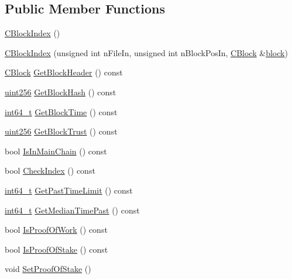 \subsection*{Public Member Functions}
\begin{DoxyCompactItemize}
\item 
\hyperlink{class_c_block_index_a0eff34cbfb4470885020734581dc1555}{C\+Block\+Index} ()
\item 
\hyperlink{class_c_block_index_a59e8716601432cd20856d45bc2f10633}{C\+Block\+Index} (unsigned int n\+File\+In, unsigned int n\+Block\+Pos\+In, \hyperlink{class_c_block}{C\+Block} \&\hyperlink{core_8h_ace80c27428e237fe24f54ae915a36133}{block})
\item 
\hyperlink{class_c_block}{C\+Block} \hyperlink{class_c_block_index_a34041486523d190d9ede5d83461fdc00}{Get\+Block\+Header} () const 
\item 
\hyperlink{classuint256}{uint256} \hyperlink{class_c_block_index_ab843ef9b8b0a0193ec3a5c24738e484f}{Get\+Block\+Hash} () const 
\item 
\hyperlink{stdint_8h_adec1df1b8b51cb32b77e5b86fff46471}{int64\+\_\+t} \hyperlink{class_c_block_index_ab63b774ae798f5f9e54b400ac8b5ef4b}{Get\+Block\+Time} () const 
\item 
\hyperlink{classuint256}{uint256} \hyperlink{class_c_block_index_ab8cb2abace4e5b6dd405e85f66f17f9a}{Get\+Block\+Trust} () const 
\item 
bool \hyperlink{class_c_block_index_ae75f87263a196d250cc2bf10d70aa510}{Is\+In\+Main\+Chain} () const 
\item 
bool \hyperlink{class_c_block_index_a32c6c256b6e30b4a20dc6faa9cac7ea5}{Check\+Index} () const 
\item 
\hyperlink{stdint_8h_adec1df1b8b51cb32b77e5b86fff46471}{int64\+\_\+t} \hyperlink{class_c_block_index_a52a53d7e151aba62e32ec4ffd165b5a7}{Get\+Past\+Time\+Limit} () const 
\item 
\hyperlink{stdint_8h_adec1df1b8b51cb32b77e5b86fff46471}{int64\+\_\+t} \hyperlink{class_c_block_index_abffb24cc73329a3dce024403ba770b4a}{Get\+Median\+Time\+Past} () const 
\item 
bool \hyperlink{class_c_block_index_ac49e7ad2d6a28e0add2f190cedc95c38}{Is\+Proof\+Of\+Work} () const 
\item 
bool \hyperlink{class_c_block_index_ace1a0acbedc0403489e4d9168876fb23}{Is\+Proof\+Of\+Stake} () const 
\item 
void \hyperlink{class_c_block_index_a4c1eb937c07db986f698909e66754c9e}{Set\+Proof\+Of\+Stake} ()
\item 

\end{DoxyCompactItemize}
